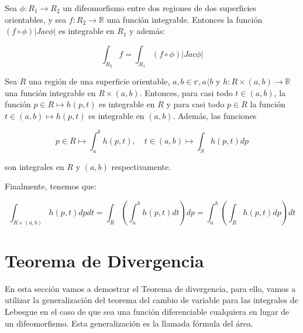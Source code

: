 \begin{theorem}
Sea $\phi:R_1 \longrightarrow R_2$ un difeomorfismo entre dos regiones de dos superficies orientables, y sea $f: R_2 \longrightarrow \mathbb{R}$ una función integrable. Entonces la función $(f \circ \phi)|Jac \phi|$ es integrable en $R_1$ y además:

\begin{equation*}
    \int_{R_2} f = \int_{R_1} (f \circ \phi)|Jac \phi|
\end{equation*}
\end{theorem}

\begin{theorem}
Sea $R$ una región de una superficie orientable, $a,b \in \mathbb{r}, a  \langle  b$ y $h:R \times (a,b) \longrightarrow \mathbb{R}$ una función integrable en $R \times (a,b)$. Entonces, para casi todo $t \in (a,b)$, la función $p \in R \mapsto h(p,t)$ es integrable en $R$ y para casi todo $p \in R$ la función $t \in (a,b) \mapsto h(p,t)$ es integrable en $(a,b)$. Además, las funciones 

\begin{equation*}
    p \in R \mapsto \int_a^b h(p,t), \quad  t \in (a,b) \mapsto \int_S h(p,t) dp
\end{equation*}

son integrales en $R$ y $(a,b)$ respectivamente.

Finalmente, tenemos que:

\begin{equation*}
    \int_{R \times (a,b)} h(p,t) dpdt = \int_R \left( \int_a^b h(p,t)dt \right) dp = \int_a^b \left( \int_R h(p,t)dp \right) dt
\end{equation*}
\end{theorem}


\section{Teorema de Divergencia}
En esta sección vamos a demostrar el Teorema de divergencia, para ello, vamos a utilizar la generalización del teorema del cambio de variable para las integrales de Lebesgue en el caso de que sea una función diferenciable cualquiera en lugar de un difeomorfismo. Esta generalización es la llamada fórmula del área.
 
